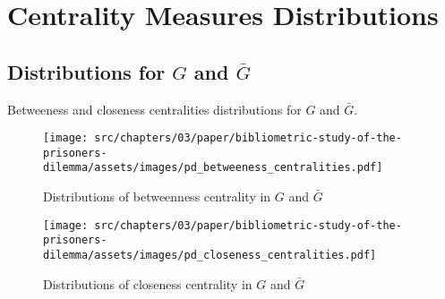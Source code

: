 




\chapter{Centrality Measures Distributions}

\section{Distributions for \(G\) and \(\bar{G}\)}

Betweeness and closeness centralities distributions for \(G\) and \(\bar{G}\).

\begin{figure}[!hbtp]
    \centering
    \texttt{[image: src/chapters/03/paper/bibliometric-study-of-the-prisoners-dilemma/assets/images/pd\_betweeness\_centralities.pdf]}
    \caption{Distributions of betweenness centrality in \(G\) and \(\bar{G}\)}
    \label{fig:bc_distributions}
\end{figure}

\begin{figure}[!hbtp]
    \centering
    \texttt{[image: src/chapters/03/paper/bibliometric-study-of-the-prisoners-dilemma/assets/images/pd\_closeness\_centralities.pdf]}
    \caption{Distributions of closeness centrality in \(G\) and \(\bar{G}\)}
    \label{fig:cc_distributions}
\end{figure}

